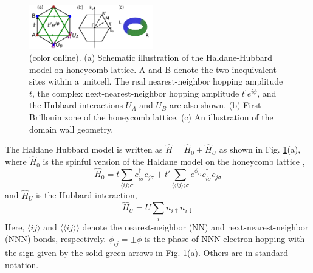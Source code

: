 \documentclass[amsmath,superscriptaddress,showpacs,aps,prl,twocolumn]{revtex4-1}
\begin{document}
\begin{figure}
\centering
\includegraphics[width=0.48\textwidth]{lattice}
\caption{(color online). (a) Schematic illustration of the Haldane-Hubbard model on honeycomb lattice. A and B denote the two inequivalent sites within a unitcell. The real nearest-neighbor hopping amplitude $t$, the complex next-nearest-neighbor hopping amplitude $t^\prime e^{i\phi}$, and the Hubbard interactions $U_A$ and $U_B$ are also shown. (b) First Brillouin zone of the honeycomb lattice. (c) An illustration of the domain wall geometry.}
\label{lattice}
\end{figure}

\par The Haldane Hubbard model is written as $\hat{H}=\hat{H}_0+\hat{H}_U$ as shown in Fig. \ref{lattice}(a), where $\hat{H}_0$ is the spinful version of the Haldane model on the honeycomb lattice \cite{Haldane_PRL1988},
\begin{equation}\label{H0}
\hat{H}_0=t\sum_{\langle ij\rangle\sigma}c^{\dagger}_{i\sigma}c_{j\sigma}+t'\sum_{\langle\langle ij\rangle\rangle\sigma}e^{\phi_{ij}}c^{\dagger}_{i\sigma}c_{j\sigma}
\end{equation}
and $\hat{H}_U$ is the Hubbard interaction,
\begin{equation}\label{HU}
\hat{H}_U=U\sum_i n_{i\uparrow}n_{i\downarrow}
\end{equation}
Here, $\langle ij\rangle$ and $\langle\langle ij\rangle\rangle$ denote the nearest-neighbor (NN) and next-nearest-neighbor (NNN) bonds, respectively. $\phi_{ij}=\pm\phi$ is the phase of NNN electron hopping with the sign given by the solid green arrows in Fig. \ref{lattice}(a). Others are in standard notation.

\end{document}
